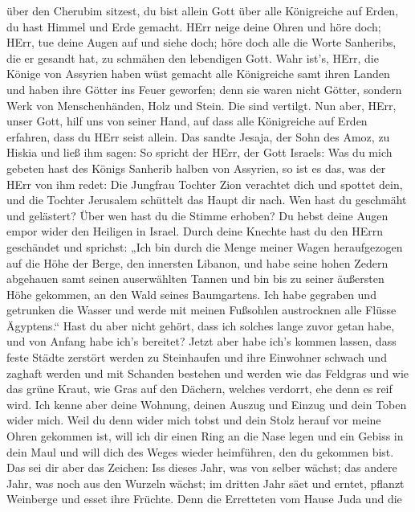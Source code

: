 über den Cherubim sitzest, du bist allein Gott über alle Königreiche auf
Erden, du hast Himmel und Erde gemacht.  HErr neige deine
Ohren und höre doch; HErr, tue deine Augen auf und siehe doch; höre doch
alle die Worte Sanheribs, die er gesandt hat, zu schmähen den lebendigen
Gott.  Wahr ist's, HErr, die Könige von Assyrien haben wüst
gemacht alle Königreiche samt ihren Landen  und haben ihre
Götter ins Feuer geworfen; denn sie waren nicht Götter, sondern Werk von
Menschenhänden, Holz und Stein. Die sind vertilgt.  Nun
aber, HErr, unser Gott, hilf uns von seiner Hand, auf dass alle
Königreiche auf Erden erfahren, dass du HErr seist allein. 
Das sandte Jesaja, der Sohn des Amoz, zu Hiskia und ließ ihm sagen: So
spricht der HErr, der Gott Israels: Was du mich gebeten hast des Königs
Sanherib halben von Assyrien,  so ist es das, was der HErr
von ihm redet: Die Jungfrau Tochter Zion verachtet dich und spottet
dein, und die Tochter Jerusalem schüttelt das Haupt dir nach.
 Wen hast du geschmäht und gelästert? Über wen hast du die
Stimme erhoben? Du hebst deine Augen empor wider den Heiligen in Israel.
 Durch deine Knechte hast du den HErrn geschändet und
sprichst: „Ich bin durch die Menge meiner Wagen heraufgezogen auf die
Höhe der Berge, den innersten Libanon, und habe seine hohen Zedern
abgehauen samt seinen auserwählten Tannen und bin bis zu seiner
äußersten Höhe gekommen, an den Wald seines Baumgartens. 
Ich habe gegraben und getrunken die Wasser und werde mit meinen
Fußsohlen austrocknen alle Flüsse Ägyptens.``  Hast du aber
nicht gehört, dass ich solches lange zuvor getan habe, und von Anfang
habe ich's bereitet? Jetzt aber habe ich's kommen lassen, dass feste
Städte zerstört werden zu Steinhaufen  und ihre Einwohner
schwach und zaghaft werden und mit Schanden bestehen und werden wie das
Feldgras und wie das grüne Kraut, wie Gras auf den Dächern, welches
verdorrt, ehe denn es reif wird.  Ich kenne aber deine
Wohnung, deinen Auszug und Einzug und dein Toben wider mich.
 Weil du denn wider mich tobst und dein Stolz herauf vor
meine Ohren gekommen ist, will ich dir einen Ring an die Nase legen und
ein Gebiss in dein Maul und will dich des Weges wieder heimführen, den
du gekommen bist.  Das sei dir aber das Zeichen: Iss dieses
Jahr, was von selber wächst; das andere Jahr, was noch aus den Wurzeln
wächst; im dritten Jahr säet und erntet, pflanzt Weinberge und esset
ihre Früchte.  Denn die Erretteten vom Hause Juda und die
